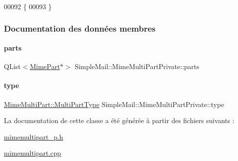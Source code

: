 \begin{DoxyCode}
00092 \{
00093 \}
\end{DoxyCode}


\subsubsection{Documentation des données membres}
\mbox{\label{class_simple_mail_1_1_mime_multi_part_private_a1b78f93d2ea55da1d40bf8c806e8ad59}} 
\paragraph{\texorpdfstring{parts}{parts}}
{\footnotesize\ttfamily Q\+List$<$\hyperlink{class_simple_mail_1_1_mime_part}{Mime\+Part}$\ast$$>$ Simple\+Mail\+::\+Mime\+Multi\+Part\+Private\+::parts}

\mbox{\label{class_simple_mail_1_1_mime_multi_part_private_ad4e1815d1d4113a61b591a243759d4c1}} 
\paragraph{\texorpdfstring{type}{type}}
{\footnotesize\ttfamily \hyperlink{class_simple_mail_1_1_mime_multi_part_a6bef6836f893f87c64c4ff0cb9a93e53}{Mime\+Multi\+Part\+::\+Multi\+Part\+Type} Simple\+Mail\+::\+Mime\+Multi\+Part\+Private\+::type}



La documentation de cette classe a été générée à partir des fichiers suivants \+:\begin{DoxyCompactItemize}
\item 
\hyperlink{mimemultipart__p_8h}{mimemultipart\+\_\+p.\+h}\item 
\hyperlink{mimemultipart_8cpp}{mimemultipart.\+cpp}\end{DoxyCompactItemize}
